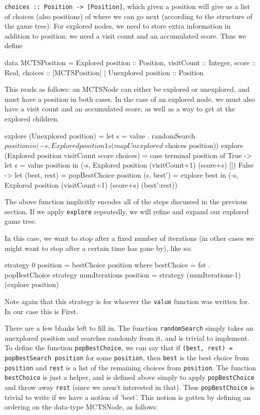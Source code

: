 \texttt{choices :: Position -> [Position]}, which given a position will give us a list of choices (also positions) of where we can go next (according to the structure of the game tree).
For explored nodes, we need to store extra information in addition to position: we need a visit count and an accumulated score. 
Thus we define
\begin{code}
  data MCTSPosition =
    Explored {position :: Position, visitCount :: Integer,
              score :: Real, choices :: [MCTSPosition]} |
    Unexplored {position :: Position}
\end{code}
This reads as follows: an MCTSNode can either be explored or unexplored, and must have a position in both cases.
In the case of an explored node, we must also have a visit count and an accumulated score, as well as a way to get at the explored children.
\begin{code}
explore (Unexplored position) =
  let s = value . randomSearch $ position in
  (-s, Explored position 1 s (map Unexplored $ choices position))
explore (Explored position visitCount score choices) = 
  case terminal position of
    True ->
      let s = value position in
      (-s, Explored position (visitCount+1) (score+s) [])
    False ->
      let (best, rest) = popBestChoice position
          (s, best') = explore best in
          (-s, Explored position (visitCount+1) (score+s) (best':rest))
\end{code}
The above function implicitly encodes all of the steps discussed in the previous section.
If we apply \texttt{explore} repeatedly, we will refine and expand our explored game tree.

In this case, we want to stop after a fixed number of iterations (in other cases we might want to stop after a certain time has gone by), like so:

\begin{code}
  strategy 0 position =
    bestChoice position
    where
    bestChoice = fst . popBestChoice
  strategy numIterations position  = 
    strategy (numIterations-1) (explore position)
\end{code}
Note again that this strategy is for whoever the \texttt{value} function was written for. In our case this is First.

There are a few blanks left to fill in.
The function \texttt{randomSearch} simply takes an unexplored position and searches randomly from it, and is trivial to implement.
To define the function \texttt{popBestChoice}, we can say that if \texttt{(best, rest) = popBestSearch position} for some \texttt{position}, then \texttt{best} is the best choice from \texttt{position} and \texttt{rest} is a list of the remaining choices from \texttt{position}.
The function \texttt{bestChoice} is just a helper, and is defined above simply to apply \texttt{popBestChoice} and throw away \texttt{rest} (since we aren't interested in that).
Thus \texttt{popBestChoice} is trivial to write if we have a notion of 'best'.
This notion is gotten by defining an ordering on the data-type MCTSNode, as follows:

